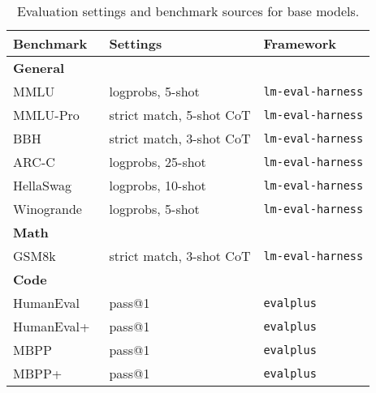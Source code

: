 \documentclass[]{bytedance_seed}
\newcommand{\1}{\mathbf{1}}
\begin{document}
\begin{table}[htbp]
\centering
\caption{Evaluation settings and benchmark sources for base models.}
\label{tab:eval_base_settings}
\footnotesize
\begin{tabular}{lll}
\toprule
\textbf{Benchmark} & \textbf{Settings} & \textbf{Framework}\\
\midrule
\multicolumn{3}{l}{\textbf{General}} \\
\quad MMLU~\citep{hendrycks2020measuring} & logprobs, 5-shot & \texttt{lm-eval-harness}\\
\quad MMLU-Pro~\citep{wang2024mmlu} & strict match, 5-shot CoT & \texttt{lm-eval-harness}  \\
\quad BBH~\citep{suzgun2022challenging} & strict match, 3-shot CoT & \texttt{lm-eval-harness}\\
\quad ARC-C~\citep{clark2018think} & logprobs, 25-shot & \texttt{lm-eval-harness} \\
\quad HellaSwag~\citep{zellers2019hellaswag} & logprobs, 10-shot & \texttt{lm-eval-harness}\\
\quad Winogrande~\citep{sakaguchi2021winogrande} & logprobs, 5-shot & \texttt{lm-eval-harness}\\

\midrule
\multicolumn{3}{l}{\textbf{Math}} \\
\quad GSM8k~\citep{cobbe2021training} & strict match, 3-shot CoT & \texttt{lm-eval-harness} \\
\midrule
\multicolumn{3}{l}{\textbf{Code}} \\
\quad HumanEval~\citep{chen2021codex}  & pass@1 & \texttt{evalplus} \\
\quad HumanEval+~\citep{evalplus} & pass@1 & \texttt{evalplus}\\
\quad MBPP~\citep{austin2021program} & pass@1 & \texttt{evalplus} \\
\quad MBPP+~\citep{evalplus} & pass@1 & \texttt{evalplus}\\
\bottomrule
\end{tabular}
\end{table}
\end{document}
